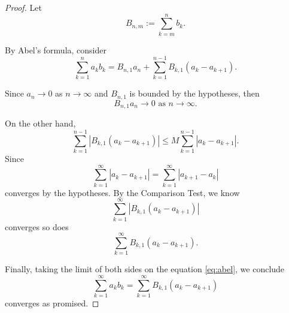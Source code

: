 \begin{Exercise}
\begin{proof}
Let 
$$
B_{n,m} := \sum_{k=m}^{n}b_k.
$$

By Abel's formula, consider 
\begin{equation}\label{eq:abel}
\sum_{k=1}^{n}a_k b_k 
= B_{n,1}a_n + \sum_{k=1}^{n-1}B_{k,1}(a_k-a_{k+1}).
\end{equation}

Since $a_n\to 0$ as $n\to\infty$ and $B_{n,1}$ is bounded by the hypotheses, then 
$$
B_{n,1}a_n\to 0\text{ as }n\to\infty.
$$

On the other hand, 
$$
\sum_{k=1}^{n-1}\left|B_{k,1}(a_k-a_{k+1})\right| 
\leq M\sum_{k=1}^{n-1}\left|a_k-a_{k+1}\right|.
$$ 
Since 
$$
\sum_{k=1}^{\infty}\left|a_k-a_{k+1}\right| 
= \sum_{k=1}^{\infty}\left|a_{k+1}-a_k\right|
$$
converges by the hypotheses. By the Comparison Test, we know 
$$
\sum_{k=1}^{\infty}\left|B_{k,1}(a_k-a_{k+1})\right|
$$ 
converges so does
$$
\sum_{k=1}^{\infty}B_{k,1}(a_k-a_{k+1}).
$$

Finally, taking the limit of both sides on the equation \eqref{eq:abel}, we conclude
$$
\sum_{k=1}^{\infty}a_k b_k 
= \sum_{k=1}^{\infty}B_{k,1}(a_k-a_{k+1})
$$ 
converges as promised.
\end{proof}
\end{Exercise}